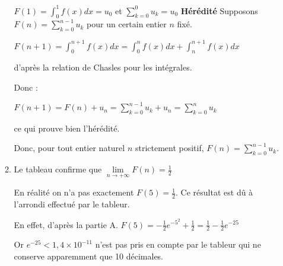 \begin{corrige}
\begin{enumerate}
\begin{enumerate}[label=\alph*.]
               $F\left(1\right) = \int_{0}^{1}f\left(x\right)dx=u_{0}$ et $\sum_{k=0}^{0}u_{k}=u_{0}$
               \textbf{Hérédité}
               Supposons $F\left(n\right) = \sum_{k=0}^{n-1}u_{k}$ pour un certain entier $n$ fixé.
               \par
               $F\left(n+1\right) = \int_{0}^{n+1}f\left(x\right)dx = \int_{0}^{n}f\left(x\right)dx + \int_{n}^{n+1}f\left(x\right)dx$
               \par
               d'après la relation de Chasles pour les intégrales.
               \par
               Donc :
               \par
               $F\left(n+1\right) = F\left(n\right) + u_{n} = \sum_{k=0}^{n-1}u_{k} + u_{n} = \sum_{k=0}^{n}u_{k}$
               \par
               ce qui prouve bien l'hérédité.
               \par
               Donc, pour tout entier naturel $n$ strictement positif, $F\left(n\right) = \sum_{k=0}^{n-1}u_{k}$.
               \item
               Le tableau confirme que $\lim\limits_{n\rightarrow +\infty }F\left(n\right)=\frac{1}{2}$
               \par
               En réalité on n'a pas exactement $F\left(5\right)=\frac{1}{2}$. Ce résultat est dû à l'arrondi effectué par le tableur.
               \par
               En effet, d'après la partie A. $F\left(5\right)=-\frac{1}{2}e^{-5^{2}}+\frac{1}{2}=\frac{1}{2}-\frac{1}{2}e^{-25}$
               \par
               Or $e^{-25} < 1,4\times 10^{-11}$ n'est pas pris en compte par le tableur qui ne conserve apparemment que 10 décimales.
          \end{enumerate}
     \end{enumerate}
\end{corrige}
